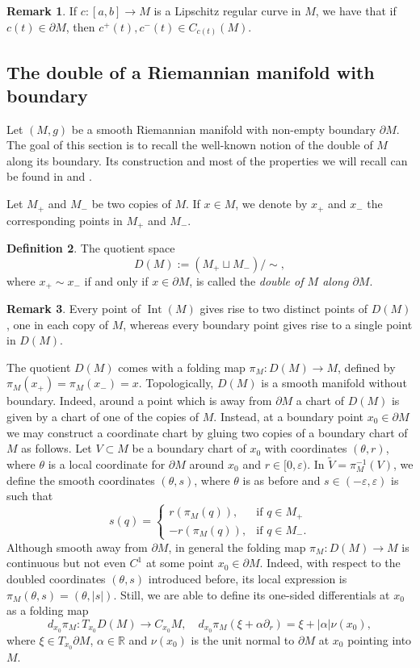 \documentclass[11pt]{article}
\theoremstyle{definition}
\newtheorem{definition}{Definition}[section]
\newtheorem{remark}[definition]{Remark}
\theoremstyle{remark}
\theoremstyle{plain}
\DeclareMathOperator{\Int}{Int}
\newcommand{\R}{\mathbb{R}}
\begin{document}
\begin{remark}
If $c: [a,b]\rightarrow M$ is a Lipschitz regular curve in $M$, we have that if $c(t)\in \partial M$, then $c^+(t),c^-(t)\in C_{c(t)}(M)$.
\end{remark}

\subsection{The double of a Riemannian manifold with boundary}

Let $(M,g)$ be a smooth Riemannian manifold with non-empty boundary $\partial M$. The goal of this section is to recall the well-known notion of the double of $M$ along its boundary. Its construction and most of the properties we will recall can be found in \cite{LeeManifolds} and \cite{Course}.

Let $M_+$ and $M_-$ be two copies of $M$. If $x\in M$, we denote by $x_+$ and $x_-$ the corresponding points in $M_+$ and $M_-$. 

\begin{definition}
The quotient space
$$D(M):=(M_+\sqcup M_-)/\sim,$$
where $x_+\sim x_-$ if and only if $x\in \partial M$, is called the \emph{double of $M$ along $\partial M$}.
\end{definition}

\begin{remark}
Every point of $\Int(M)$ gives rise to two distinct points of $D(M)$, one in each copy of $M$, whereas every boundary point gives rise to a single point in $D(M)$.
\end{remark}

The quotient $D(M)$ comes with a folding map $\pi_M:D(M)\to M$, defined by $\pi_M(x_+) = \pi_M(x_-) = x$. Topologically, $D(M)$ is a smooth manifold without boundary. Indeed, around a point which is away from $\partial M$ a chart of $D(M)$ is given by a chart of one of the copies of $M$. 
Instead, at a boundary point $x_0\in \partial M$ we may construct a coordinate chart by gluing two copies of a boundary chart of $M$ as follows. Let $V\subset M$ be a boundary chart of $x_0$ with coordinates $(\theta,r)$, where $\theta$ is a local coordinate for $\partial M$ around $x_0$ and $r\in[0,\varepsilon)$. In $\tilde V = \pi_M^{-1}(V)$, we define the smooth coordinates $(\theta,s)$, where $\theta$ is as before and $s\in (-\varepsilon,\varepsilon)$ is such that 
$$s(q) = \begin{cases}
           r(\pi_M(q)), & \mbox{if } q\in M_+ \\
           -r(\pi_M(q)), & \mbox{if } q\in M_-.
         \end{cases}$$
Although smooth away from $\partial M$, in general the folding map $\pi_M:D(M)\to M$ is continuous but not even $C^1$ at some point $x_0\in \partial M$. Indeed, with respect to the doubled coordinates $(\theta,s)$ introduced before, its local expression is $\pi_M(\theta,s)=(\theta,|s|)$. Still, we are able to define its one-sided differentials at $x_0$ as a folding map
$$d_{x_0}\pi_M:T_{x_0}D(M)\to C_{x_0}M,\quad d_{x_0}\pi_M(\xi+\alpha \partial_r) = \xi + |\alpha|\nu(x_0),$$ 
where $\xi\in T_{x_0}\partial M$, $\alpha\in \R$ and $\nu(x_0)$ is the unit normal to $\partial M$ at $x_0$ pointing into $M$.
\end{document}
